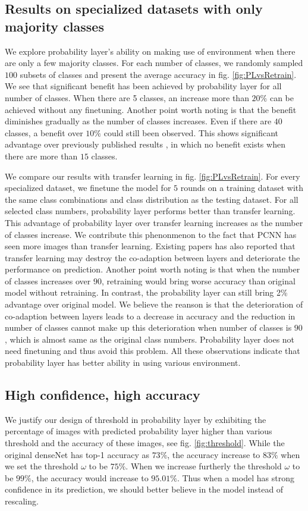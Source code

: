 \documentclass{article}
\begin{document}
\subsection{Results on specialized datasets with only majority classes}
We explore probability layer's ability on making use of environment when there are only a few majority classes. For each number of classes, we randomly sampled $100$ subsets of classes and present the average accuracy in fig. \ref{fig:PLvsRetrain}. We see that significant benefit has been achieved by probability layer for all number of classes. When there are 5 classes, an increase more than $20\%$ can be achieved without any finetuning. Another point worth noting is that the benefit diminishes gradually as the number of classes increases. Even if there are $40$ classes, a benefit over $10\%$ could still been observed. This shows significant advantage over previously published results \cite{shen2017fast}, in which no benefit exists when there are more than $15$ classes.
 
We compare our results with transfer learning in fig. \ref{fig:PLvsRetrain}. For every specialized dataset, we finetune the model for $5$ rounds on a training dataset with the same class combinations and class distribution as the testing dataset. For all selected class numbers, probability layer performs better than transfer learning. This advantage of probability layer over transfer learning increases as the number of classes increase. We contribute this phenonmenon to the fact that PCNN has seen more images than transfer learning. Existing papers \cite{yosinski2014transferable} has also reported that transfer learning may destroy the co-adaption between layers and deteriorate the performance on prediction. Another point worth noting is that when the number of classes increases over $90$, retraining would bring worse accuracy than original model without retraining. In contrast, the probability layer can still bring 2\% advantage over original model. We believe the reanson is that the deterioration of co-adaption between layers leads to a decrease in accuracy and the reduction in number of classes cannot make up this deterioration when number of classes is $90$, which is almost same as the original class numbers. Probability layer does not need finetuning and thus avoid this problem. All these observations indicate that probability layer has better ability in using various environment.


\subsection{High confidence, high accuracy}
We justify our design of threshold in probability layer by exhibiting the percentage of images with predicted probability layer higher than various threshold and the accuracy of these images, see fig. \ref{fig:threshold}. While the original denseNet has top-1 accuracy as $73\%$, the accuracy increase to $83\%$ when we set the threshold $\omega$ to be $75\%$. When we increase furtherly the threshold $\omega$ to be $99\%$, the accuracy would increase to $95.01\%$. Thus when a model has strong confidence in its prediction, we should better believe in the model instead of rescaling. 
\end{document}
